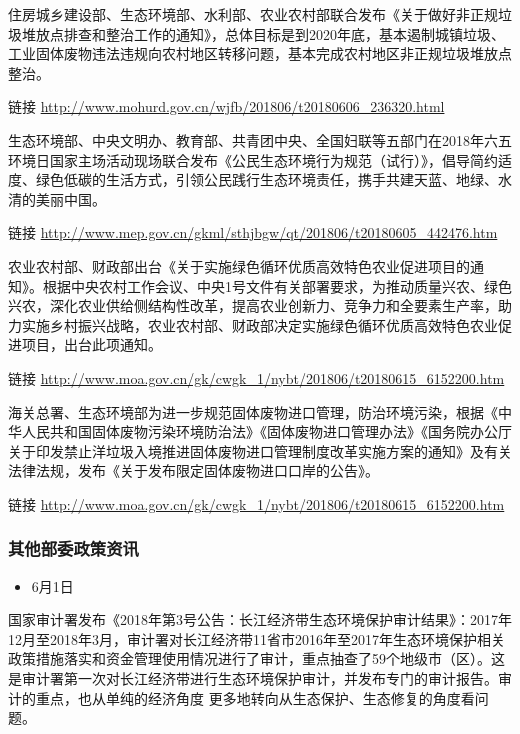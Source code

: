 \documentclass[]{book}
\providecommand{\tightlist}{%
  \setlength{\itemsep}{0pt}\setlength{\parskip}{0pt}}
\begin{document}
住房城乡建设部、生态环境部、水利部、农业农村部联合发布《关于做好非正规垃圾堆放点排查和整治工作的通知》，总体目标是到2020年底，基本遏制城镇垃圾、工业固体废物违法违规向农村地区转移问题，基本完成农村地区非正规垃圾堆放点整治。

链接 \url{http://www.mohurd.gov.cn/wjfb/201806/t20180606_236320.html}

生态环境部、中央文明办、教育部、共青团中央、全国妇联等五部门在2018年六五环境日国家主场活动现场联合发布《公民生态环境行为规范（试行）》，倡导简约适度、绿色低碳的生活方式，引领公民践行生态环境责任，携手共建天蓝、地绿、水清的美丽中国。

链接 \url{http://www.mep.gov.cn/gkml/sthjbgw/qt/201806/t20180605_442476.htm}

农业农村部、财政部出台《关于实施绿色循环优质高效特色农业促进项目的通知》。根据中央农村工作会议、中央1号文件有关部署要求，为推动质量兴农、绿色兴农，深化农业供给侧结构性改革，提高农业创新力、竞争力和全要素生产率，助力实施乡村振兴战略，农业农村部、财政部决定实施绿色循环优质高效特色农业促进项目，出台此项通知。

链接 \url{http://www.moa.gov.cn/gk/cwgk_1/nybt/201806/t20180615_6152200.htm}

海关总署、生态环境部为进一步规范固体废物进口管理，防治环境污染，根据《中华人民共和国固体废物污染环境防治法》《固体废物进口管理办法》《国务院办公厅关于印发禁止洋垃圾入境推进固体废物进口管理制度改革实施方案的通知》及有关法律法规，发布《关于发布限定固体废物进口口岸的公告》。

链接 \url{http://www.moa.gov.cn/gk/cwgk_1/nybt/201806/t20180615_6152200.htm}

\hypertarget{ux5176ux4ed6ux90e8ux59d4ux653fux7b56ux8d44ux8baf-2}{%
\subsubsection*{其他部委政策资讯}\label{ux5176ux4ed6ux90e8ux59d4ux653fux7b56ux8d44ux8baf-2}}

\begin{itemize}
\tightlist
\item
  6月1日
\end{itemize}

国家审计署发布《2018年第3号公告：长江经济带生态环境保护审计结果》：2017年12月至2018年3月，审计署对长江经济带11省市2016年至2017年生态环境保护相关政策措施落实和资金管理使用情况进行了审计，重点抽查了59个地级市（区）。这是审计署第一次对长江经济带进行生态环境保护审计，并发布专门的审计报告。审计的重点，也从单纯的经济角度 更多地转向从生态保护、生态修复的角度看问题。
\end{document}
